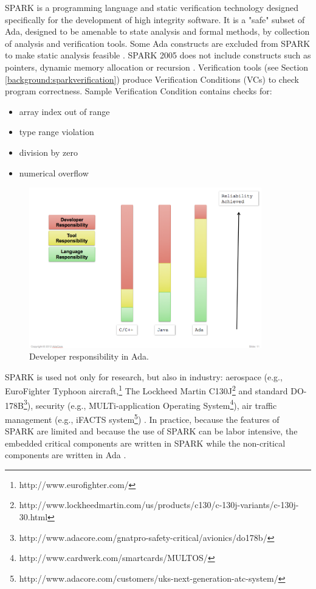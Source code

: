 SPARK is a programming language and static verification technology designed specifically for the development of high integrity software. It is a "safe" subset of Ada, designed to be amenable to state analysis and formal methods, by collection of analysis and verification tools. Some Ada constructs are excluded from SPARK to make static analysis feasible \cite{Spark:Article}. SPARK 2005 does not include constructs such as pointers, dynamic memory allocation or recursion \cite{Spark:Article}. Verification tools (see Section \ref{background:sparkverification}) produce Verification Conditions (VCs) to check program correctness. Sample Verification Condition contains checks for:
\begin{itemize} %
    \item array index out of range
    \item type range violation
    \item division by zero
    \item numerical overflow
\end{itemize}

\begin{figure}[h]%
    \begin{center}
    	\includegraphics[width=0.9\textwidth]{figures/developer_responsibility_in_ada.png}    	
    \end{center}
    \caption{Developer responsibility in Ada.\protect\footnotemark }
    \label{figure:developer-responsibility-in-ada}
\end{figure}

SPARK is used not only for research, but also in industry: aerospace (e.g., EuroFighter Typhoon aircraft,\footnote{http://www.eurofighter.com/} The Lockheed Martin C130J\footnote{http://www.lockheedmartin.com/us/products/c130/c-130j-variants/c-130j-30.html} and standard DO-178B\footnote{http://www.adacore.com/gnatpro-safety-critical/avionics/do178b/}), security (e.g., MULTi-application Operating System\footnote{http://www.cardwerk.com/smartcards/MULTOS/}), air traffic management (e.g., iFACTS system\footnote{http://www.adacore.com/customers/uks-next-generation-atc-system/}) \cite{Barnes:Book}. In practice, because the features of SPARK are limited and because the use of SPARK can be labor intensive, the embedded critical components are written in SPARK while the non-critical components are written in Ada \cite{Spark:IndustrialExp}.

